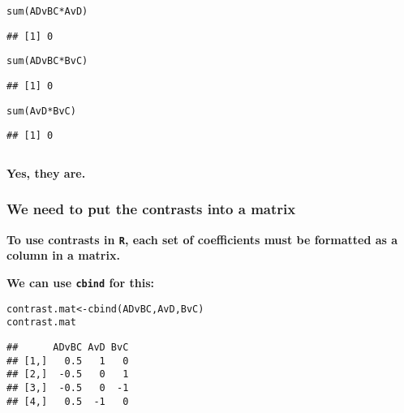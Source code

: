 \documentclass[color=usenames,dvipsnames]{beamer}\usepackage[]{graphicx}\usepackage[]{color}
\makeatletter
\newcommand{\hlopt}[1]{\textcolor[rgb]{0,0,0}{#1}}%
\newcommand{\hlstd}[1]{\textcolor[rgb]{0,0,0}{#1}}%
\newcommand{\hlkwb}[1]{\textcolor[rgb]{0,0.341,0.682}{#1}}%
\newcommand{\hlkwd}[1]{\textcolor[rgb]{0.004,0.004,0.506}{#1}}%
\newenvironment{kframe}{%
 \def\at@end@of@kframe{}%
 \ifinner\ifhmode%
  \def\at@end@of@kframe{\end{minipage}}%
  \begin{minipage}{\columnwidth}%
 \fi\fi%
 \def\FrameCommand##1{\hskip\@totalleftmargin \hskip-\fboxsep
 \colorbox{shadecolor}{##1}\hskip-\fboxsep
     \hskip-\linewidth \hskip-\@totalleftmargin \hskip\columnwidth}%
 \MakeFramed {\advance\hsize-\width
   \@totalleftmargin\z@ \linewidth\hsize
   \@setminipage}}%
 {\par\unskip\endMakeFramed%
 \at@end@of@kframe}
\newenvironment{knitrout}{}{} %
\makeatother
\begin{document}
\begin{frame}[fragile]
\begin{columns}
\begin{column}{0.5\textwidth}
\begin{knitrout}
\begin{kframe}
\begin{alltt}
\hlkwd{sum}\hlstd{(ADvBC} \hlopt{*} \hlstd{AvD)}
\end{alltt}
\begin{verbatim}
## [1] 0
\end{verbatim}
\begin{alltt}
\hlkwd{sum}\hlstd{(ADvBC} \hlopt{*} \hlstd{BvC)}
\end{alltt}
\begin{verbatim}
## [1] 0
\end{verbatim}
\begin{alltt}
\hlkwd{sum}\hlstd{(AvD} \hlopt{*} \hlstd{BvC)}
\end{alltt}
\begin{verbatim}
## [1] 0
\end{verbatim}
\end{kframe}
\end{knitrout}
  \end{column}
\end{columns}
\pause
\vfill
{%
  \bf Yes, they are. \par}
\end{frame}









\begin{frame}[fragile]
  \frametitle{We need to put the contrasts into a matrix}
  {\bf To use contrasts in {\tt R}, each set of coefficients must be formatted as a column in a matrix. \par }
  \pause
  \vfill
  {\bf We can use {\tt cbind} for this:}
\begin{knitrout}
\color{fgcolor}\begin{kframe}
\begin{alltt}
\hlstd{contrast.mat} \hlkwb{<-} \hlkwd{cbind}\hlstd{(ADvBC, AvD, BvC)}
\hlstd{contrast.mat}
\end{alltt}
\begin{verbatim}
##      ADvBC AvD BvC
## [1,]   0.5   1   0
## [2,]  -0.5   0   1
## [3,]  -0.5   0  -1
## [4,]   0.5  -1   0
\end{verbatim}
\end{kframe}
\end{knitrout}
\end{frame}
\end{document}

